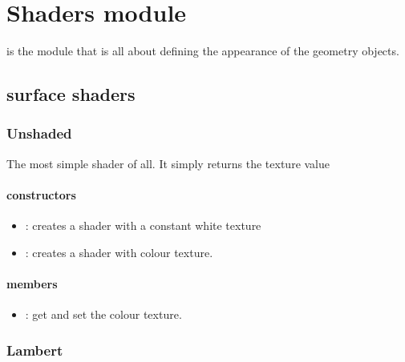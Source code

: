 %

\chapter{Shaders module}

 is the module that is all about defining the appearance of the geometry objects.

\section{surface shaders}

\subsection{Unshaded}\label{shaders.Unshaded}

The most simple shader of all.  It simply returns the texture value

\subsubsection*{constructors}
\begin{itemize}
	\item {}:
		creates a shader with a constant white texture
	\item {}:
		creates a shader with colour texture.
\end{itemize}

\subsubsection*{members}
\begin{itemize}
	\item {}:
		get and set the colour texture.
\end{itemize}



\subsection{Lambert}\label{shaders.Lambert}


